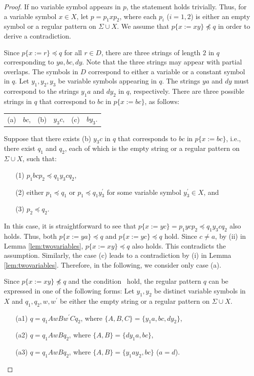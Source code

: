   \begin{proof}
  If no variable symbol appears in $p$, the statement holds trivially.
  Thus, for a variable symbol $x\in X$, let $p=p_{1}xp_{2}$, where each $p_{i}$ ($i=1,2$) is either an empty symbol or a regular pattern on $\Sigma\cup X$.
  We assume that $p \{ x := xy \} \not \preceq q$ in order to derive a contradiction.

  Since $p \{ x := r \} \preceq q$ for all $r \in D$, there are three strings of length $2$ in $q$ corresponding to $ya, bc, dy$.
  Note that the three strings may appear with partial overlaps.
  The symbols in $D$ correspond to either a variable or a constant symbol in $q$.
  Let $y_{1}, y_{2}, y_{3}$ be variable symbols appearing in $q$.
  The strings $ya$ and $dy$ must correspond to the strings $y_{1}a$ and $dy_{2}$ in $q$, respectively.
  There are three possible strings in $q$ that correspond to $bc$ in $p\{x:=bc\}$, as follows:
  \begin{center}
    \begin{tabular}{cccccc}
      \textrm{(a)} & $bc$, & \textrm{(b)} & $y_{3}c$, & \textrm{(c)} & $by_{3}$.
    \end{tabular}
  \end{center}

  Suppose that there exists (b) $y_{3}c$ in $q$ that corresponds to $bc$ in $p\{x:=bc\}$, i.e., there exist $q_{1}$ and $q_{2}$, each of which is the empty string or a regular pattern on $\Sigma\cup X$, such that:
  \begin{enumerate}
  \item[(1)] $p_{1}bcp_{2} \preceq q_{1}y_{3}cq_{2}$, 
  \item[(2)] either $p_{1} \preceq q_{1}$ or $p_{1} \preceq q_{1}y_{3}^{\prime}$ for some variable symbol $y_{3}^{\prime}\in X$, and
  \item[(3)] $p_{2} \preceq q_{2}$.
  \end{enumerate}
  In this case, it is straightforward to see that $p\{x:=yc\} = p_{1}ycp_{2} \preceq q_{1}y_{3}cq_{2}$ also holds.
  Thus, both $p\{x:=ya\}\preceq q$ and $p\{x:=yc\}\preceq q$ hold. Since $c\not= a$, by (ii) in Lemma \ref{lem:twovariables}, $p\{x:=xy\}\preceq q$ also holds. This contradicts the assumption.
  Similarly, the case (c) leads to a contradiction by (i) in Lemma \ref{lem:twovariables}.
  Therefore, in the following, we consider only case (a).

  Since $p \{ x := xy \} \not \preceq q$ and the condition \TheConditionA\ hold, the regular pattern $q$ can be expressed in one of the following forms: Let $y_{1}, y_{2}$ be distinct variable symbols in $X$ and $q_{1}, q_{2}, w, w^{\prime}$ be either the empty string or a regular pattern on $\Sigma\cup X$.
  \begin{enumerate}
  \item[(a1)] $q=q_{1}AwBw^{\prime}Cq_{2}$, where $\{ A,B,C \} = \{ y_{1}a,bc,dy_{2} \}$,
  \item[(a2)] $q=q_{1}AwBq_{2}$, where $\{ A,B \} = \{ dy_{1}a,bc \}$,
  \item[(a3)] $q=q_{1}AwBq_{2}$, where $\{ A,B \} = \{ y_{1}ay_{2},bc \}$ ($a = d$).
  \end{enumerate}
  

\end{proof}
